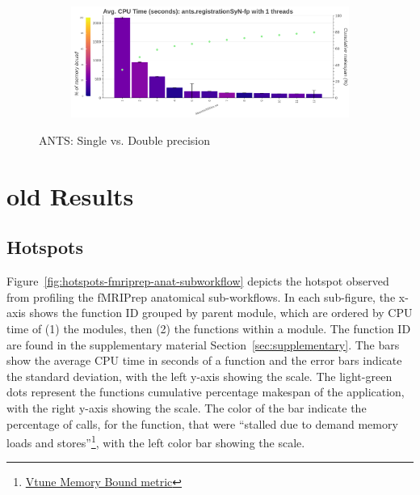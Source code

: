 \documentclass[conference]{IEEEtran}
\begin{document}
\begin{figure}[ht!]
\begin{subfigure}[t]{0.49\textwidth}
	\end{subfigure}
	\hfill
	\begin{subfigure}[t]{0.49\textwidth}
		\caption{}
		\label{subfig:hotspots-ants-registrationSyN-fp}
		\includegraphics[width=\textwidth]{figures/hotspots-1thread-ants-registrationSyN-fp.png}
	\end{subfigure}
	\caption{ANTS: Single vs. Double precision}
	\label{fig:ants-fp-comparison}
\end{figure}
					
\section{old Results}
					
		
					
\subsection{Hotspots}
Figure~\ref{fig:hotspots-fmriprep-anat-subworkflow} depicts the hotspot observed from profiling the fMRIPrep anatomical sub-workflows. In each sub-figure, the x-axis shows the function ID grouped by parent module, which are ordered by CPU time of (1) the modules, then (2) the functions within a module. The function ID are found in the supplementary material Section~\ref{sec:supplementary}. The bars show the average CPU time in seconds of a function and the error bars indicate the standard deviation, with the left y-axis showing the scale. The light-green dots represent the functions cumulative percentage makespan of the application, with the right y-axis showing the scale. The color of the bar indicate the percentage of calls, for the function, that were ``stalled due to demand memory loads and stores''\footnote{\href{https://www.intel.com/content/www/us/en/docs/vtune-profiler/user-guide/2023-0/cpu-metrics-reference.html\#MEMORY-BOUND}{Vtune Memory Bound metric}}, with the left color bar showing the scale.
					
\end{document}
